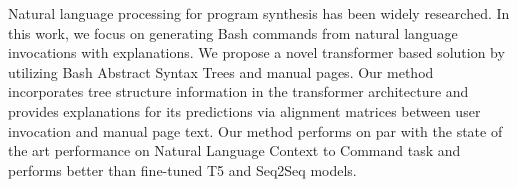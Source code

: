 Natural language processing for program synthesis has been widely researched. In this work, we focus on generating Bash commands from natural language invocations with explanations. We propose a novel transformer based solution by utilizing Bash Abstract Syntax Trees and manual pages. Our method incorporates tree structure information in the transformer architecture and provides explanations for its predictions via alignment matrices between user invocation and manual page text. Our method performs on par with the state of the art performance on Natural Language Context to Command task and performs better than fine-tuned T5 and Seq2Seq models.
